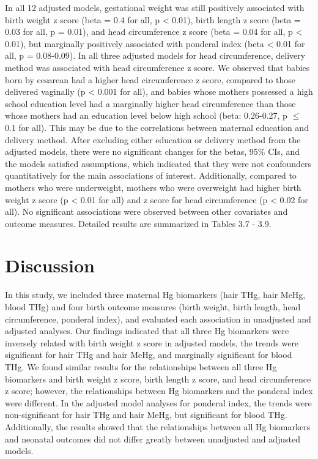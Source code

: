 In all 12 adjusted models, gestational weight was still positively associated with birth weight z score (beta = 0.4 for all, p < 0.01), birth length z score (beta = 0.03 for all, p = 0.01), and head circumference z score (beta = 0.04 for all, p < 0.01), but marginally positively associated with ponderal index (beta < 0.01 for all, p = 0.08-0.09). In all three adjusted models for head circumference, delivery method was associated with head circumference z score. We observed that babies born by cesarean had a higher head circumference z score, compared to those delivered vaginally (p < 0.001 for all), and babies whose mothers possessed a high school education level had a marginally higher head circumference than those whose mothers had an education level below high school (beta: 0.26-0.27, p ${\le}$ 0.1 for all). This may be due to the correlations between maternal education and delivery method. After excluding either education or delivery method from
the adjusted models, there were no significant changes for the betas, 95\% CIs, and the models satisfied assumptions, which indicated that they were not confounders quantitatively for the main associations of interest. Additionally, compared to mothers who were underweight, mothers who were overweight had higher birth weight z score (p < 0.01 for all) and z score for head circumference (p < 0.02 for all). No significant associations were observed between other covariates and outcome measures. Detailed
results are summarized in Tables 3.7 - 3.9.

\section{Discussion}

In this study, we included three maternal Hg biomarkers (hair THg, hair MeHg, blood THg) and four birth outcome measures (birth weight, birth length, head circumference, ponderal index), and evaluated each association in unadjusted and adjusted analyses. Our findings indicated that all three Hg biomarkers were inversely related with birth weight z score in adjusted models, the trends were significant for hair THg and hair MeHg, and marginally significant for blood THg. We found similar results for the relationships between all three Hg biomarkers and birth weight z score, birth length z score, and head circumference z score; however, the relationships between Hg biomarkers and the ponderal index were different. In the adjusted model analyses for ponderal index, the trends were non-significant for hair THg and hair MeHg, but significant for blood THg. Additionally, the results showed that the relationships between all Hg biomarkers and neonatal outcomes did not differ greatly between unadjusted and adjusted models.

